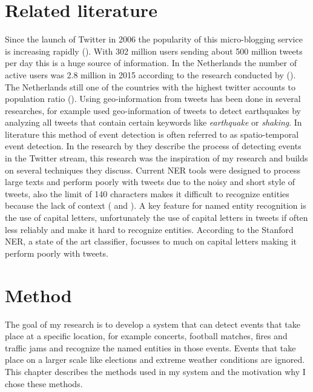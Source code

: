 \documentclass[
10pt, %
a4paper, %
oneside, %
headinclude,footinclude, %
BCOR5mm, %
]{scrartcl}
\begin{document}
\section{Related literature}

Since the launch of Twitter in 2006 the popularity of this micro-blogging service is increasing rapidly (\citealt{statista}). With 302 million users sending about 500 million tweets per day this is a huge source of information. 
In the Netherlands the number of active users was 2.8 million in 2015 according to the research conducted by (\citealt{newcom}). The Netherlands still one of the countries with the highest twitter accounts to population ratio (\citealt{dawson}).
\vl
Using geo-information from tweets has been done in several researches, for example \citeauthor{sakaki2010earthquake} used geo-information of tweets to detect earthquakes by analyzing all tweets that contain certain keywords like \textit{earthquake} or \textit{shaking}. In literature this method of event detection is often referred to as spatio-temporal event detection. In the research by \cite{walther2013geo} they describe the process of detecting events in the Twitter stream, this research was the inspiration of my research and builds on several techniques they discuss. 
\vl
Current NER tools were designed to process large texts and perform poorly with tweets due to the noisy and short style of tweets, also the limit of 140 characters makes it difficult to recognize entities because the lack of context (\citealt{ner2011} and \citealt{liu2011ner}). A key feature for named entity recognition is the use of capital letters, unfortunately the use of capital letters in tweets if often less reliably and make it hard to recognize entities. According to \citeauthor{ner2011} the Stanford NER, a state of the art classifier, focusses to much on capital letters making it perform poorly with tweets.



\newpage
\section{Method}
The goal of my research is to develop a system that can detect events that take place at a specific location, for example concerts, football matches, fires and traffic jams and recognize the named entities in those events. Events that take place on a larger scale like elections and extreme weather conditions are ignored. This chapter describes the methods used in my system and the motivation why I chose these methods.
\end{document}
